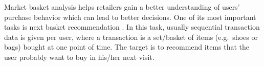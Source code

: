 \documentclass[10pt,journal,compsoc]{IEEEtran}
\begin{document}
\IEEEdisplaynontitleabstractindextext



%
\IEEEpeerreviewmaketitle



Market basket analysis helps retailers gain a better understanding of users' purchase behavior which can lead to better decisions. One of its most important tasks is next basket recommendation \cite{workshop_prob_pref,case_basket,binaryBasket,paps}. In this task, usually sequential transaction data is given per user, where a transaction is a set/basket of items (e.g.~shoes or bags) bought at one point of time. The target is to recommend items that the user probably want to buy in his/her next visit.
\end{document}
